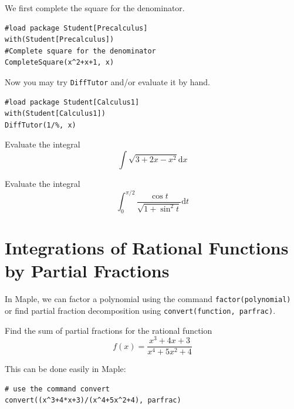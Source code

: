 \documentclass[en,11pt,simple]{elegantbook}
\let\BeginKnitrBlock\begin \let\EndKnitrBlock\end
\begin{document}
\BeginKnitrBlock{solution}{}{}
{}

We first complete the square for the denominator.

\begin{verbatim}
#load package Student[Precalculus]
with(Student[Precalculus])
#Complete square for the denominator
CompleteSquare(x^2+x+1, x)
\end{verbatim}

Now you may try \texttt{DiffTutor} and/or evaluate it by hand.

\begin{verbatim}
#load package Student[Calculus1]
with(Student[Calculus1])
DiffTutor(1/%, x)
\end{verbatim}
\EndKnitrBlock{solution}

\BeginKnitrBlock{exercise}{}{}
\protect\hypertarget{exr:unnamed-chunk-206}{}{\label{exr:unnamed-chunk-206} }
Evaluate the integral
\[
\int \sqrt{3+2 x-x^{2}} \mathrm{d} x
\]
\EndKnitrBlock{exercise}

\BeginKnitrBlock{exercise}{}{}
\protect\hypertarget{exr:unnamed-chunk-207}{}{\label{exr:unnamed-chunk-207} }
Evaluate the integral
\[
\int_{0}^{\pi / 2} \frac{\cos t}{\sqrt{1+\sin ^{2} t}} \mathrm{d} t
\]
\EndKnitrBlock{exercise}

\hypertarget{integrations-of-rational-functions-by-partial-fractions}{%
\section{Integrations of Rational Functions by Partial Fractions}\label{integrations-of-rational-functions-by-partial-fractions}}

In Maple, we can factor a polynomial using the command \texttt{factor(polynomial)} or find partial fraction decomposition using \texttt{convert(function,\ parfrac)}.

\BeginKnitrBlock{example}{}{}
\protect\hypertarget{exm:unnamed-chunk-208}{}{\label{exm:unnamed-chunk-208} }
Find the sum of partial fractions for the rational function
\[
f(x)=\frac{x^3+4x+3}{x^4+5x^2+4}
\]
\EndKnitrBlock{example}

\BeginKnitrBlock{solution}{}{}
{}
This can be done easily in Maple:

\begin{verbatim}
# use the command convert
convert((x^3+4*x+3)/(x^4+5x^2+4), parfrac)
\end{verbatim}
\EndKnitrBlock{solution}
\end{document}
